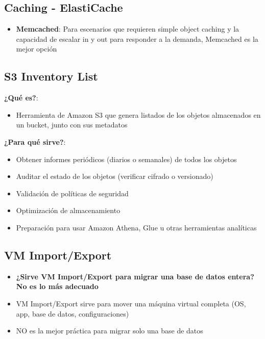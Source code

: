\documentclass[12pt,a4paper]{report}
\newcommand{\important}[1]{\textcolor{dangerred}{\textbf{#1}}}
\begin{document}
\subsection{Caching - ElastiCache}

\begin{itemize}
    \item \textbf{Memcached}: Para escenarios que requieren simple object caching y la capacidad de escalar in y out para responder a la demanda, Memcached es la mejor opción
\end{itemize}

\subsection{S3 Inventory List}

\textbf{¿Qué es?}:
\begin{itemize}
    \item Herramienta de Amazon S3 que genera listados de los objetos almacenados en un bucket, junto con sus metadatos
\end{itemize}

\textbf{¿Para qué sirve?}:
\begin{itemize}
    \item Obtener informes periódicos (diarios o semanales) de todos los objetos
    \item Auditar el estado de los objetos (verificar cifrado o versionado)
    \item Validación de políticas de seguridad
    \item Optimización de almacenamiento
    \item Preparación para usar Amazon Athena, Glue u otras herramientas analíticas
\end{itemize}

\subsection{VM Import/Export}

\begin{itemize}
    \item \important{¿Sirve VM Import/Export para migrar una base de datos entera? No es lo más adecuado}
    \item VM Import/Export sirve para mover una máquina virtual completa (OS, app, base de datos, configuraciones)
    \item NO es la mejor práctica para migrar solo una base de datos
\end{itemize}
\end{document}

